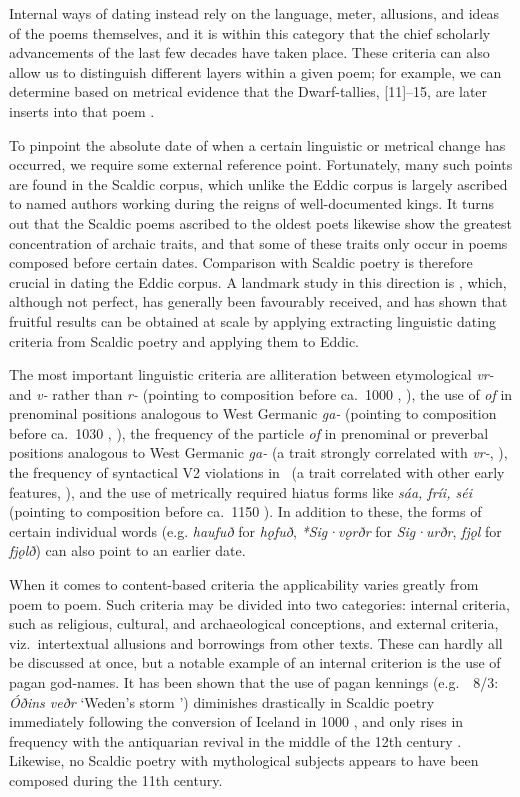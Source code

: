 Internal ways of dating instead rely on the language, meter, allusions, and ideas of the poems themselves, and it is within this category that the chief scholarly advancements of the last few decades have taken place.  These criteria can also allow us to distinguish different layers within a given poem; for example, we can determine based on metrical evidence that the Dwarf-tallies, [11]--15, are later inserts into that poem \parencite[373]{Males2025Hlod}.

To pinpoint the absolute date of when a certain linguistic or metrical change has occurred, we require some external reference point.  Fortunately, many such points are found in the Scaldic corpus, which unlike the Eddic corpus is largely ascribed to named authors working during the reigns of well-documented kings.  It turns out that the Scaldic poems ascribed to the oldest poets likewise show the greatest concentration of archaic traits, and that some of these traits only occur in poems composed before certain dates.  Comparison with Scaldic poetry is therefore crucial in dating the Eddic corpus.
A landmark study in this direction is \textcite{Sapp2022}, which, although not perfect, has generally been favourably received, and has shown that fruitful results can be obtained at scale by applying extracting linguistic dating criteria from Scaldic poetry and applying them to Eddic.

The most important linguistic criteria are alliteration between etymological \emph{vr-} and \emph{v-} rather than \emph{r-} (pointing to composition before ca.~1000 \ce, \cite{Haukur2017}), the use of \emph{of} in prenominal positions analogous to West Germanic \emph{ga-} (pointing to composition before ca.~1030 \ce, \cite{Males2025Of}),
the frequency of the particle \emph{of} in prenominal or preverbal positions analogous to West Germanic \emph{ga-} (a trait strongly correlated with \emph{vr-}, \cite[54]{Haukur2016}),
the frequency of syntactical V2 violations in \Fornyrdislag\ (a trait correlated with other early features, \cite{Haukur2012}),
and the use of metrically required hiatus forms like \emph{sáa, fríi, séi} (pointing to composition before ca.~1150 \ce).  In addition to these, the forms of certain individual words (e.g. \emph{haufuð} for \emph{hǫfuð}, \emph{*Sig·vǫrðr} for \emph{Sig·urðr}, \emph{fjǫl} for \emph{fjǫlð}) can also point to an earlier date.

When it comes to content-based criteria the applicability varies greatly from poem to poem.  Such criteria may be divided into two categories: internal criteria, such as religious, cultural, and archaeological conceptions, and external criteria, viz.~intertextual allusions and borrowings from other texts.  These can hardly all be discussed at once, but a notable example of an internal criterion is the use of pagan god-names.  It has been shown that the use of pagan kennings (e.g.~\Hakonarmal\ 8/3: \emph{Óðins veðr} ‘Weden’s storm ’) diminishes drastically in Scaldic poetry immediately following the conversion of Iceland in 1000 \ce, and only rises in frequency with the antiquarian revival in the middle of the 12th century \parencite[39--94]{Males2020}.  Likewise, no Scaldic poetry with mythological subjects appears to have been composed during the 11th century.

